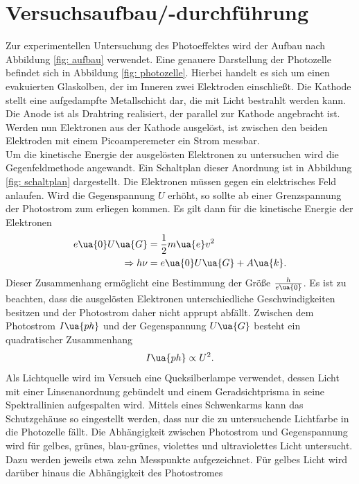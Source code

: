 \section{Versuchsaufbau/-durchführung}
Zur experimentellen Untersuchung des Photoeffektes wird der Aufbau nach Abbildung \ref{fig: aufbau} verwendet. Eine
genauere Darstellung der Photozelle befindet sich in Abbildung \ref{fig: photozelle}. Hierbei handelt es sich um einen
evakuierten Glaskolben, der im Inneren zwei Elektroden einschließt. Die Kathode stellt eine aufgedampfte
Metallschicht dar, die mit Licht bestrahlt werden kann. Die Anode ist als Drahtring realisiert, der parallel
zur Kathode angebracht ist. Werden nun Elektronen aus der Kathode ausgelöst, ist zwischen den beiden Elektroden
mit einem Picoamperemeter ein Strom messbar. \\
Um die kinetische Energie der ausgelösten Elektronen zu untersuchen wird die Gegenfeldmethode angewandt. Ein Schaltplan
dieser Anordnung ist in Abbildung \ref{fig: schaltplan} dargestellt. Die Elektronen müssen gegen ein elektrisches Feld anlaufen.
Wird die Gegenspannung $U$ erhöht, so sollte ab einer Grenzspannung der Photostrom zum erliegen kommen. Es gilt dann
für die kinetische Energie der Elektronen
\begin{align}
\begin{aligned}
  e\ua{0} U\ua{G} &= \frac{1}{2}m\ua{e}v^2 \\
  \Rightarrow h\nu &= e\ua{0}U\ua{G} + A\ua{k}.
\end{aligned}
\end{align}
Dieser Zusammenhang ermöglicht eine Bestimmung der Größe $\frac{h}{e\ua{0}}$. Es ist zu beachten, dass
die ausgelösten Elektronen unterschiedliche Geschwindigkeiten besitzen und der Photostrom daher nicht apprupt
abfällt. Zwischen dem Photostrom $I\ua{ph}$ und der Gegenspannung $U\ua{G}$ besteht ein quadratischer Zusammenhang
\begin{equation}
  I\ua{ph} \propto U^2.
\end{equation}
Als Lichtquelle wird im Versuch eine Queksilberlampe verwendet, dessen Licht mit einer Linsenanordnung gebündelt
und einem Geradsichtprisma in seine Spektrallinien aufgespalten wird. Mittels eines Schwenkarms kann das Schutzgehäuse
so eingestellt werden, dass nur die zu untersuchende Lichtfarbe in die Photozelle fällt. Die Abhängigkeit zwischen
Photostrom und Gegenspannung wird für gelbes, grünes, blau-grünes, violettes und ultraviolettes Licht untersucht. Dazu
werden jeweils etwa zehn Messpunkte aufgezeichnet. Für gelbes Licht wird darüber hinaus die Abhängigkeit des Photostromes
